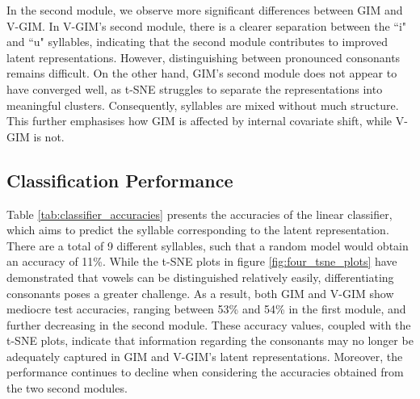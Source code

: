 	In the second module, we observe more significant differences between GIM and V-GIM. In V-GIM's second module, there is a clearer separation between the ``i" and ``u" syllables, indicating that the second module contributes to improved latent representations. However, distinguishing between pronounced consonants remains difficult. On the other hand, GIM's second module does not appear to have converged well, as t-SNE struggles to separate the representations into meaningful clusters. Consequently, syllables are mixed without much structure. This further emphasises how GIM is affected by internal covariate shift, while V-GIM is not.
	
	
	
		
	
	\subsection{Classification Performance} \label{cha:exper_classifier}
	Table \ref{tab:classifier_accuracies} presents the accuracies of the linear classifier, which aims to predict the syllable corresponding to the latent representation. There are a total of 9 different syllables, such that a random model would obtain an accuracy of 11\%. While the t-SNE plots in figure \ref{fig:four_tsne_plots} have demonstrated that vowels can be distinguished relatively easily, differentiating consonants poses a greater challenge. As a result, both GIM and V-GIM show mediocre test accuracies, ranging between 53\% and 54\% in the first module, and further decreasing in the second module. These accuracy values, coupled with the t-SNE plots, indicate that information regarding the consonants may no longer be adequately captured in GIM and V-GIM's latent representations. Moreover, the performance continues to decline when considering the accuracies obtained from the two second modules.
	
	
	
